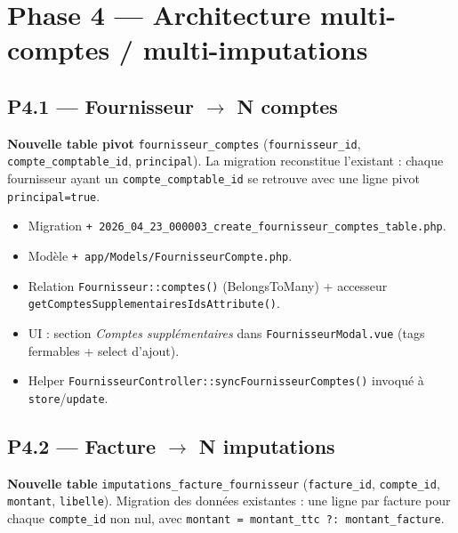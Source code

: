 \documentclass[11pt,a4paper]{article}
\newcommand{\modfile}[1]{\texttt{\small #1}}
\newcommand{\newfile}[1]{\texttt{\small\textcolor{accent}{+ #1}}}
\begin{document}
\newpage

\section{Phase 4 --- Architecture multi-comptes / multi-imputations}

\subsection{P4.1 --- Fournisseur \(\rightarrow\) N comptes}

\textbf{Nouvelle table pivot} \texttt{fournisseur\_comptes}
(\texttt{fournisseur\_id}, \texttt{compte\_comptable\_id}, \texttt{principal}).
La migration reconstitue l'existant : chaque fournisseur ayant un
\texttt{compte\_comptable\_id} se retrouve avec une ligne pivot
\texttt{principal=true}.

\begin{itemize}[leftmargin=1.4em]
  \item Migration \newfile{2026\_04\_23\_000003\_create\_fournisseur\_comptes\_table.php}.
  \item Modèle \newfile{app/Models/FournisseurCompte.php}.
  \item Relation \texttt{Fournisseur::comptes()} (BelongsToMany) + accesseur
    \texttt{getComptesSupplementairesIdsAttribute()}.
  \item UI : section \emph{Comptes supplémentaires} dans \modfile{FournisseurModal.vue}
    (tags fermables + select d'ajout).
  \item Helper \modfile{FournisseurController::syncFournisseurComptes()} invoqué
    à \texttt{store}/\texttt{update}.
\end{itemize}

\subsection{P4.2 --- Facture \(\rightarrow\) N imputations}

\textbf{Nouvelle table} \texttt{imputations\_facture\_fournisseur}
(\texttt{facture\_id}, \texttt{compte\_id}, \texttt{montant}, \texttt{libelle}).
Migration des données existantes : une ligne par facture pour chaque
\texttt{compte\_id} non nul, avec \texttt{montant = montant\_ttc ?: montant\_facture}.
\end{document}
